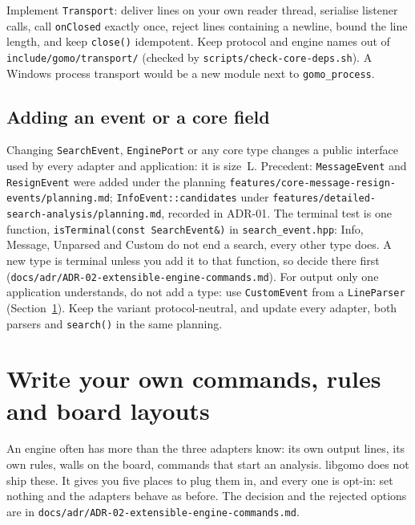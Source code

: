 \documentclass[11pt,a4paper]{article}
\newcommand{\code}[1]{\texttt{#1}}
\newcommand{\file}[1]{\texttt{#1}}
\begin{document}
Implement \code{Transport}: deliver lines on your own reader thread, serialise listener calls,
call \code{onClosed} exactly once, reject lines containing a newline, bound the line length, and keep
\code{close()} idempotent. Keep protocol and engine names out of
\file{include/gomo/transport/} (checked by \file{scripts/check-core-deps.sh}). A Windows process
transport would be a new module next to \code{gomo\_process}.

\subsection{Adding an event or a core field}

Changing \code{SearchEvent}, \code{EnginePort} or any core type changes a public interface used by
every adapter and application: it is size~L. Precedent: \code{MessageEvent} and \code{ResignEvent}
were added under the planning \file{features/core-message-resign-events/planning.md};
\code{InfoEvent::candidates} under \file{features/detailed-search-analysis/planning.md}, recorded
in ADR-01. The terminal test is one function, \code{isTerminal(const SearchEvent\&)} in
\file{search\_event.hpp}: Info, Message, Unparsed and Custom do not end a search, every other
type does. A new type is terminal unless you add it to that function, so decide there first
(\file{docs/adr/ADR-02-\allowbreak extensible-engine-commands.md}). For output only one application understands,
do not add a type: use \code{CustomEvent} from a \code{LineParser} (Section~\ref{sec:own}). Keep
the variant protocol-neutral, and update every adapter, both parsers and \code{search()} in the
same planning.

\section{Write your own commands, rules and board layouts}\label{sec:own}

An engine often has more than the three adapters know: its own output lines, its own rules, walls
on the board, commands that start an analysis. libgomo does not ship these. It gives you five
places to plug them in, and every one is opt-in: set nothing and the adapters behave as before.
The decision and the rejected options are in \file{docs/adr/ADR-02-\allowbreak extensible-engine-commands.md}.
\end{document}

